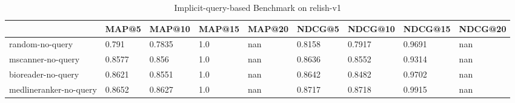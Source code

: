\begin{table}
\centering
\caption{Implicit-query-based Benchmark on relish-v1}
\label{tab:noquery-benchmark-relish-v1}
\begin{tabular}{lllllllll}
\toprule
{} &    MAP@5 &  MAP@10 & MAP@15 & MAP@20 &   NDCG@5 & NDCG@10 & NDCG@15 & NDCG@20 \\
\midrule
random-no-query        &    0.791 &  0.7835 &    1.0 &    nan &   0.8158 &  0.7917 &  0.9691 &     nan \\
mscanner-no-query      &   0.8577 &   0.856 &    1.0 &    nan &   0.8636 &  0.8552 &  0.9314 &     nan \\
bioreader-no-query     &   0.8621 &  0.8551 &    1.0 &    nan &   0.8642 &  0.8482 &  0.9702 &     nan \\
medlineranker-no-query &   0.8652 &  0.8627 &    1.0 &    nan &   0.8717 &  0.8718 &  0.9915 &     nan \\
\bottomrule
\end{tabular}
\end{table}


